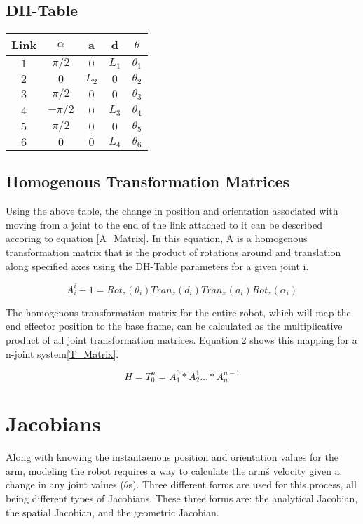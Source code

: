 \documentclass[10pt,journal]{IEEEtran}
\begin{document}
\subsection{DH-Table}
\begin{center}
\begin{tabular}{ | c | c | c | c | c | } 
		\hline
		Link   & $\alpha$ & a     & d     & $\theta$   \\
\hline\hline
		$1$    & $\pi/2$  & $0$   & $L_1$ & $\theta_1$ \\
\hline
		$2$    & $0$      & $L_2$ & $0$   & $\theta_2$ \\
\hline
		$3$    & $\pi/2$  & $0$   & $0$   & $\theta_3$ \\
\hline
		$4$    & $-\pi/2$ & $0$   & $L_3$   & $\theta_4$ \\
\hline
		$5$    & $\pi/2$  & $0$   & $0$   & $\theta_5$ \\
\hline
		$6$    & $0$      & $0$   & $L_4$ & $\theta_6$ \\
		\hline
	\end{tabular}
\end{center}

\subsection{Homogenous Transformation Matrices}
Using the above table, the change in position and orientation
associated with moving from a joint to the end of the link
attached to it can be described accoring to equation \ref{A_Matrix}. In this
equation, A is a homogenous transformation matrix that is
the product of rotations around and translation along specified
axes using the DH-Table parameters for a given joint i.

\begin{equation}\label{A_Matrix}
	A_i^i-1=Rot_z(\theta_i)Tran_z(d_i)Tran_x(a_i)Rot_z(\alpha_i)
\end{equation}

The homogenous transformation matrix for the entire robot,
which will map the end effector position to the base frame,
can be calculated as the multiplicative product of all joint
transformation matrices. Equation 2 shows this mapping for
a n-joint system\ref{T_Matrix}.

\begin{equation}\label{T_Matrix}
	H=T_0^n = A_1^0*A_2^1 \dots*A_n^{n-1}
\end{equation}

\section{Jacobians}
Along with knowing the instantaenous position and orientation
values for the arm, modeling the robot requires a way
to calculate the arm\'s velocity given a change in any joint
values ($\theta$s). Three different forms are used for this process,
all being different types of Jacobians. These three forms are:
the analytical Jacobian, the spatial Jacobian, and the geometric
Jacobian.
\end{document}
